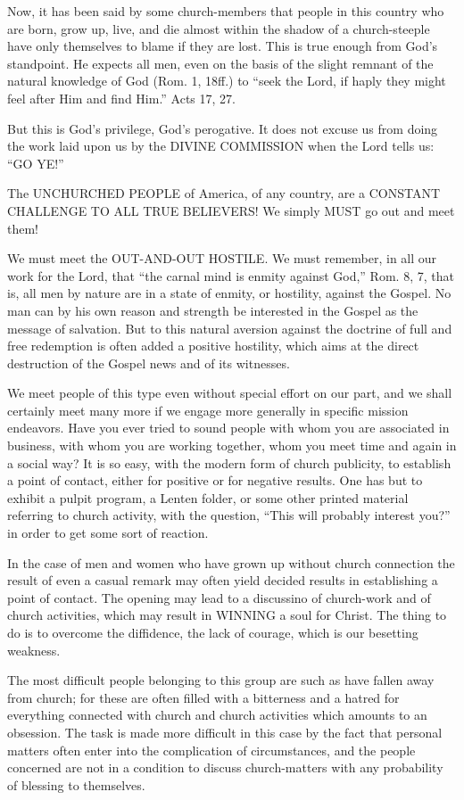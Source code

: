 \documentclass[
]{book}
\begin{document}
Now, it has been said by some church-members that people in this country who are born, grow up, live, and die almost within the shadow of a church-steeple have only themselves to blame if they are lost. This is true enough from God's standpoint. He expects all men, even on the basis of the slight remnant of the natural knowledge of God (Rom. 1, 18ff.) to ``seek the Lord, if haply they might feel after Him and find Him.'' Acts 17, 27.

But this is God's privilege, God's perogative. It does not excuse us from doing the work laid upon us by the DIVINE COMMISSION when the Lord tells us: ``GO YE!''

The UNCHURCHED PEOPLE of America, of any country, are a CONSTANT CHALLENGE TO ALL TRUE BELIEVERS! We simply MUST go out and meet them!

We must meet the OUT-AND-OUT HOSTILE. We must remember, in all our work for the Lord, that ``the carnal mind is enmity against God,'' Rom. 8, 7, that is, all men by nature are in a state of enmity, or hostility, against the Gospel. No man can by his own reason and strength be interested in the Gospel as the message of salvation. But to this natural aversion against the doctrine of full and free redemption is often added a positive hostility, which aims at the direct destruction of the Gospel news and of its witnesses.

We meet people of this type even without special effort on our part, and we shall certainly meet many more if we engage more generally in specific mission endeavors. Have you ever tried to sound people with whom you are associated in business, with whom you are working together, whom you meet time and again in a social way? It is so easy, with the modern form of church publicity, to establish a point of contact, either for positive or for negative results. One has but to exhibit a pulpit program, a Lenten folder, or some other printed material referring to church activity, with the question, ``This will probably interest you?'' in order to get some sort of reaction.

In the case of men and women who have grown up without church connection the result of even a casual remark may often yield decided results in establishing a point of contact. The opening may lead to a discussino of church-work and of church activities, which may result in WINNING a soul for Christ. The thing to do is to overcome the diffidence, the lack of courage, which is our besetting weakness.

The most difficult people belonging to this group are such as have fallen away from church; for these are often filled with a bitterness and a hatred for everything connected with church and church activities which amounts to an obsession. The task is made more difficult in this case by the fact that personal matters often enter into the complication of circumstances, and the people concerned are not in a condition to discuss church-matters with any probability of blessing to themselves.
\end{document}
